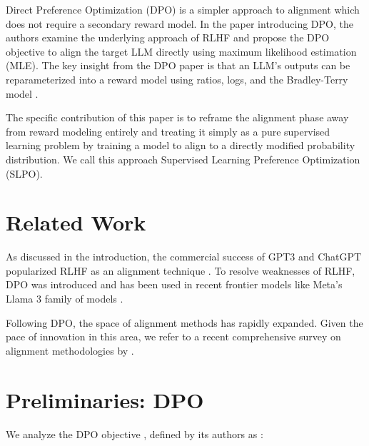 \documentclass[twoside,11pt]{article}
\begin{document}
Direct Preference Optimization (DPO) is a simpler approach to alignment
which does not require a secondary reward model. In the paper introducing
DPO, the authors examine the underlying
approach of RLHF and propose
the DPO objective to align the target LLM directly using
maximum likelihood estimation (MLE). 
The key insight from the DPO paper is that an LLM's
outputs can be reparameterized into a reward model using ratios, logs,
and the Bradley-Terry model \citep{bradley1952rank}.

The specific contribution of this paper is to reframe the alignment
phase away from reward modeling entirely and treating it simply as
a pure supervised learning problem by training a model to align to
a directly modified probability distribution. We call this
approach Supervised Learning Preference Optimization (SLPO).

\section{Related Work}

As discussed in the introduction,
the commercial success of GPT3 and ChatGPT popularized RLHF
as an 
alignment technique \citep{ouyang2022training}. To resolve
weaknesses of RLHF, DPO was introduced and has
been used in recent frontier models
like Meta's Llama 3 family of models \citep{Rafailov, llama}.

Following DPO, the space of alignment methods has rapidly expanded.
Given the pace of innovation in this area, 
we refer to a recent comprehensive survey on 
alignment methodologies by \cite{wang2024comprehensivesurveyllmalignment}.

\section{Preliminaries: DPO}

We analyze the DPO objective \cite[Eq. 7]{Rafailov},  
defined by its authors as :
\end{document}
